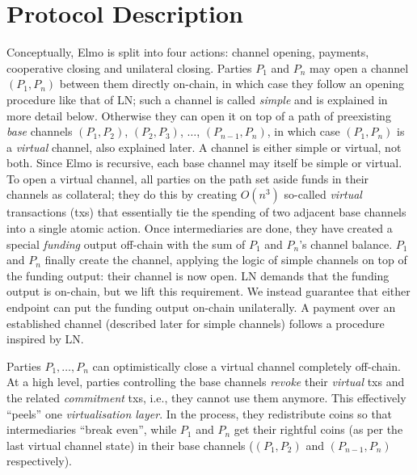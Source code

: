 \section{Protocol Description}
  Conceptually, Elmo is split into four actions: channel opening,
  payments, cooperative closing and unilateral closing. Parties $P_1$ and $P_n$
  may open a channel $(P_1, P_n)$ between them directly on-chain, in which case
  they follow an opening procedure like that of LN; such a channel is called
  \emph{simple} and is explained in more detail below.
  Otherwise they can open it on top of a path
  of preexisting \emph{base} channels $(P_1, P_2)$, $(P_2, P_3)$, $\dots$,
  $(P_{n-1}, P_{n})$, in which case $(P_1, P_n)$ is a \emph{virtual}
  channel, also explained later. A channel is either simple or virtual, not both. Since Elmo is
  recursive, each base channel may itself be simple or
  virtual. To open a virtual
  channel, all parties on the
  path set aside funds in their channels as
  collateral; they do this
  by creating $O(n^3)$ so-called \emph{virtual} transactions (txs) that essentially
  tie the spending of two adjacent base channels into a single atomic action.
  Once intermediaries are done, they have created a special \emph{funding}
  output off-chain with the sum of $P_1$ and $P_n$'s channel
  balance. $P_1$ and $P_n$
  finally create the channel, applying the logic of simple channels on top of
  the funding output: their channel is now open. LN demands that the funding
  output is on-chain, but we lift this requirement. We instead guarantee that
  either endpoint can put the funding output on-chain unilaterally.
  A payment over an established channel (described later for simple channels) follows a procedure inspired by
  LN.

  Parties $P_1, \dots, P_n$ can optimistically close a virtual channel
  completely off-chain. At a high
  level, parties controlling the base channels \emph{revoke} their \emph{virtual}
  txs and the related \emph{commitment} txs, i.e., they cannot use them
  anymore. This effectively ``peels'' one \emph{virtualisation layer}.
  In the process, they redistribute coins so that intermediaries ``break even'',
  while $P_1$
  and $P_n$ get their rightful coins (as per the last virtual channel
  state) in their base channels ($(P_1, P_2)$ and $(P_{n-1}, P_n)$ respectively).

